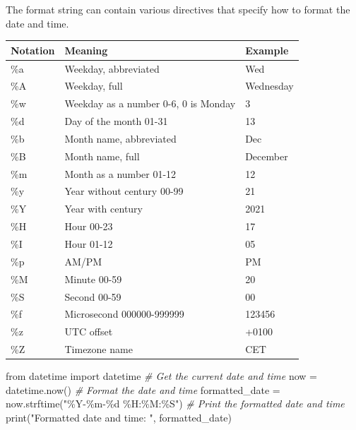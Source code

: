 \documentclass[11pt]{article}
\newcounter{none}
\newenvironment{Shaded}{}{}
\newcommand{\StringTok}[1]{\textcolor[rgb]{0.25,0.44,0.63}{{#1}}}
\newcommand{\CommentTok}[1]{\textcolor[rgb]{0.38,0.63,0.69}{\textit{{#1}}}}
\newcommand{\NormalTok}[1]{{#1}}
\newcommand{\SpecialCharTok}[1]{\textcolor[rgb]{0.25,0.44,0.63}{{#1}}}
\newcommand{\ImportTok}[1]{{#1}}
\newcommand{\OperatorTok}[1]{\textcolor[rgb]{0.40,0.40,0.40}{{#1}}}
\newcommand{\BuiltInTok}[1]{{#1}}
\begin{document}
The format string can contain various directives that specify how to
format the date and time.

{\def\LTcaptype{none} %
\begin{longtable}[]{@{}lll@{}}
\toprule\noalign{}

\textbf{Notation} & \textbf{Meaning} & \textbf{Example} \\

\midrule\noalign{}
\endhead
\bottomrule\noalign{}
\endlastfoot
\%a & Weekday, abbreviated & Wed \\
\%A & Weekday, full & Wednesday \\
\%w & Weekday as a number 0-6, 0 is Monday & 3 \\
\%d & Day of the month 01-31 & 13 \\
\%b & Month name, abbreviated & Dec \\
\%B & Month name, full & December \\
\%m & Month as a number 01-12 & 12 \\
\%y & Year without century 00-99 & 21 \\
\%Y & Year with century & 2021 \\
\%H & Hour 00-23 & 17 \\
\%I & Hour 01-12 & 05 \\
\%p & AM/PM & PM \\
\%M & Minute 00-59 & 20 \\
\%S & Second 00-59 & 00 \\
\%f & Microsecond 000000-999999 & 123456 \\
\%z & UTC offset & +0100 \\
\%Z & Timezone name & CET \\
\end{longtable}
}

\begin{Shaded}
\begin{Highlighting}[]
\ImportTok{from}\NormalTok{ datetime }\ImportTok{import}\NormalTok{ datetime}
\CommentTok{\# Get the current date and time}
\NormalTok{now }\OperatorTok{=}\NormalTok{ datetime.now()}
\CommentTok{\# Format the date and time}
\NormalTok{formatted\_date }\OperatorTok{=}\NormalTok{ now.strftime(}\StringTok{"\%Y{-}\%m{-}}\SpecialCharTok{\%d}\StringTok{ \%H:\%M:\%S"}\NormalTok{)}
\CommentTok{\# Print the formatted date and time}
\BuiltInTok{print}\NormalTok{(}\StringTok{"Formatted date and time: "}\NormalTok{, formatted\_date)}
\end{Highlighting}
\end{Shaded}
\end{document}
